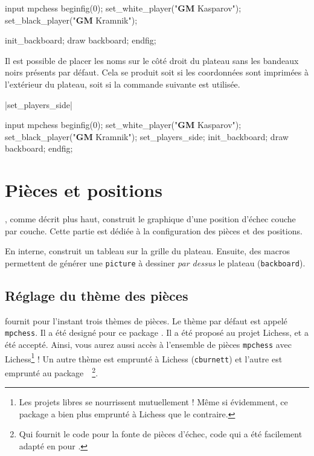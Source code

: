 \documentclass[french]{ltxdoc}
\begin{document}
\begin{ExempleMP}
input mpchess
beginfig(0);
set_white_player("\textbf{GM} Kasparov");
set_black_player("\textbf{GM} Kramnik");

init_backboard;
draw backboard;
endfig;
\end{ExempleMP}

Il est possible de placer les noms sur le côté droit du plateau sans les
bandeaux noirs présents par défaut. Cela se produit soit si les coordonnées sont
imprimées à l’extérieur du plateau, soit si la commande suivante est utilisée.

\commande|set_players_side|\smallskip

\begin{ExempleMP}[righthand width=0.6\linewidth]
input mpchess
beginfig(0);
set_white_player("\textbf{GM} Kasparov");
set_black_player("\textbf{GM} Kramnik");
set_players_side;
init_backboard;
draw backboard;
endfig;
\end{ExempleMP}



\section{Pièces et positions}

\mpchess, comme décrit plus haut, construit le graphique d’une position d’échec
couche par couche. Cette partie est dédiée à la configuration des pièces et des
positions.

En interne, \mpchess construit un tableau sur la grille du plateau. Ensuite, des
macros permettent de générer une \lstinline+picture+ à dessiner \emph{par
  dessus} le plateau (\lstinline+backboard+).

\subsection{Réglage du thème des pièces}

\mpchess fournit pour l’instant trois thèmes de pièces. Le thème par défaut est
appelé \lstinline+mpchess+. Il a été designé pour ce package .
Il a été proposé au projet Lichess, et a été accepté. Ainsi, vous aurez aussi
accès à l’ensemble de pièces \lstinline+mpchess+ avec Lichess\footnote{Les
projets libres se nourrissent mutuellement ! Même si évidemment, ce package a
bien plus emprunté à Lichess que le contraire.} ! Un autre thème est emprunté à
Lichess (\lstinline+cburnett+) et  l’autre est emprunté au package~~\cite{ctan-skak}\footnote{Qui
  fournit le code \MF{} pour la fonte de pièces d’échec, code qui a été
  facilement adapté en \MP{} pour \mpchess.}.
\end{document}
